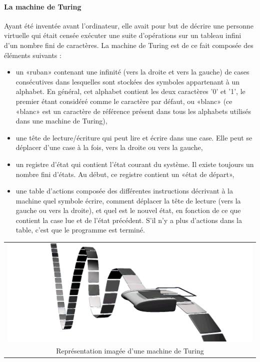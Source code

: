 \paragraph{La machine de Turing}

Ayant été inventée avant l'ordinateur, elle avait pour but de décrire une personne virtuelle qui était censée exécuter une suite d'opérations sur un tableau infini d'un nombre fini de caractères. La machine de Turing est de ce fait composée des éléments suivants :
\begin{itemize}
\item un «ruban» contenant une infinité (vers la droite et vers la gauche) de cases consécutives dans lesquelles sont stockées des symboles appartenant à un alphabet. En général, cet alphabet contient les deux caractères '0' et '1', le premier étant considéré comme le caractère par défaut, ou «blanc» (ce «blanc» est un caractère de référence présent dans tous les alphabets utilisés dans une machine de Turing),
\item une tête de lecture/écriture qui peut lire et écrire dans une case. Elle peut se déplacer d'une case à la fois, vers la droite ou vers la gauche,
\item un registre d'état qui contient l'état courant du système. Il existe toujours un nombre fini d'états. Au début, ce registre contient un «état de départ»,
\item une table d'actions composée des différentes instructions décrivant à la machine quel symbole écrire, comment déplacer la tête de lecture (vers la gauche ou vers la droite), et quel est le nouvel état, en fonction de ce que contient la case lue et de l'état précédent. S'il n'y a plus d'actions dans la table, c'est que le programme est terminé.\\
\end{itemize}

\begin{center}
\begin{tabular}{c}
\includegraphics[scale=0.15]{img/turing}\\
Représentation imagée d'une machine de Turing
\end{tabular}
\end{center}


